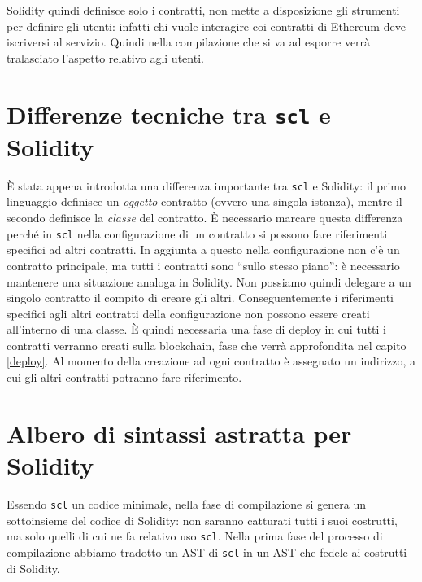 \documentclass[12pt,a4paper]{report}
\begin{document}
Solidity quindi definisce solo i contratti, non mette a disposizione gli
strumenti per definire gli utenti: infatti chi vuole interagire coi
contratti di Ethereum deve iscriversi al servizio. Quindi nella
compilazione che si va ad esporre verrà tralasciato l'aspetto relativo
agli utenti.

\hypertarget{differenze-tecniche-tra-scl-e-solidity}{%
\section{\texorpdfstring{Differenze tecniche tra \texttt{scl} e
Solidity}{Differenze tecniche tra scl e Solidity}}\label{differenze-tecniche-tra-scl-e-solidity}}

È stata appena introdotta una differenza importante tra \texttt{scl} e
Solidity: il primo linguaggio definisce un \emph{oggetto} contratto
(ovvero una singola istanza), mentre il secondo definisce la
\emph{classe} del contratto. È necessario marcare questa differenza
perché in \texttt{scl} nella configurazione di un contratto si possono
fare riferimenti specifici ad altri contratti. In aggiunta a questo
nella configurazione non c'è un contratto principale, ma tutti i
contratti sono ``sullo stesso piano'': è necessario mantenere una
situazione analoga in Solidity. Non possiamo quindi delegare a un
singolo contratto il compito di creare gli altri. Conseguentemente i
riferimenti specifici agli altri contratti della configurazione non
possono essere creati all'interno di una classe. È quindi necessaria una
fase di deploy in cui tutti i contratti verranno creati sulla
blockchain, fase che verrà approfondita nel capito \ref{deploy}. Al
momento della creazione ad ogni contratto è assegnato un indirizzo, a
cui gli altri contratti potranno fare riferimento.

\hypertarget{albero-di-sintassi-astratta-per-solidity}{%
\section{Albero di sintassi astratta per
Solidity}\label{albero-di-sintassi-astratta-per-solidity}}

Essendo \texttt{scl} un codice minimale, nella fase di compilazione si
genera un sottoinsieme del codice di Solidity: non saranno catturati
tutti i suoi costrutti, ma solo quelli di cui ne fa relativo uso
\texttt{scl}. Nella prima fase del processo di compilazione abbiamo
tradotto un AST di \texttt{scl} in un AST che fedele ai costrutti di
Solidity.
\end{document}
